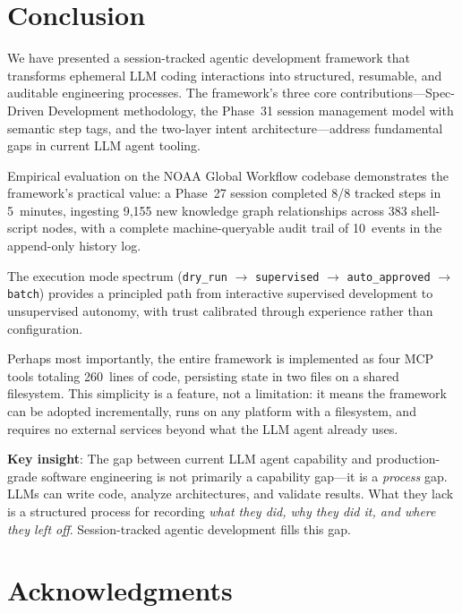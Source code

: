 \documentclass[11pt,letterpaper]{article}
\begin{document}
\section{Conclusion}
\label{sec:conclusion}

We have presented a session-tracked agentic development framework that
transforms ephemeral LLM coding interactions into structured, resumable,
and auditable engineering processes.  The framework's three core
contributions---Spec-Driven Development methodology, the Phase~31
session management model with semantic step tags, and the two-layer
intent architecture---address fundamental gaps in current LLM agent
tooling.

Empirical evaluation on the NOAA Global Workflow codebase demonstrates
the framework's practical value: a Phase~27 session completed 8/8
tracked steps in 5~minutes, ingesting 9{,}155 new knowledge graph
relationships across 383 shell-script nodes, with a complete
machine-queryable audit trail of 10~events in the append-only history
log.

The execution mode spectrum (\texttt{dry\_run} $\to$ \texttt{supervised}
$\to$ \texttt{auto\_approved} $\to$ \texttt{batch}) provides a
principled path from interactive supervised development to unsupervised
autonomy, with trust calibrated through experience rather than
configuration.

Perhaps most importantly, the entire framework is implemented as four
MCP tools totaling 260~lines of code, persisting state in two files on
a shared filesystem.  This simplicity is a feature, not a limitation:
it means the framework can be adopted incrementally, runs on any platform
with a filesystem, and requires no external services beyond what the LLM
agent already uses.

\textbf{Key insight}: The gap between current LLM agent capability and
production-grade software engineering is not primarily a capability
gap---it is a \emph{process} gap.  LLMs can write code, analyze
architectures, and validate results.  What they lack is a structured
process for recording \emph{what they did, why they did it, and where
they left off}.  Session-tracked agentic development fills this gap.

\section*{Acknowledgments}
\end{document}
